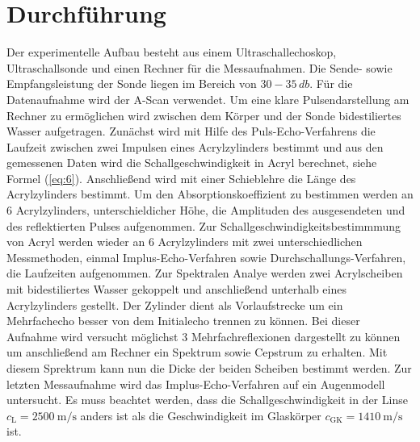\section{Durchführung}
Der experimentelle Aufbau besteht aus einem Ultraschallechoskop, Ultraschallsonde und einen Rechner für die Messaufnahmen.
Die Sende- sowie Empfangsleistung der Sonde liegen im Bereich von $30 - 35\, db$. Für die Datenaufnahme wird der A-Scan verwendet.
Um eine klare Pulsendarstellung am Rechner zu ermöglichen wird zwischen dem Körper und der Sonde bidestiliertes Wasser aufgetragen.
Zunächst wird mit Hilfe des Puls-Echo-Verfahrens die Laufzeit zwischen zwei Impulsen eines Acrylzylinders bestimmt und aus den gemessenen
Daten wird die Schallgeschwindigkeit in Acryl berechnet, siehe Formel (\ref{eq:6}).
Anschließend wird mit einer Schieblehre die Länge des Acrylzylinders bestimmt.
Um den Absorptionskoeffizient zu bestimmen werden an 6 Acrylzylinders, unterschieldicher Höhe, die Amplituden des ausgesendeten und des reflektierten Pulses aufgenommen.
Zur Schallgeschwindigkeitsbestimmmung von Acryl werden wieder an 6 Acrylzylinders mit zwei unterschiedlichen Messmethoden, einmal Implus-Echo-Verfahren sowie Durchschallungs-Verfahren,
die Laufzeiten aufgenommen.
\newline
Zur Spektralen Analye werden zwei Acrylscheiben mit bidestiliertes Wasser gekoppelt und anschließend unterhalb eines Acrylzylinders gestellt.
Der Zylinder dient als Vorlaufstrecke um ein Mehrfachecho besser von dem Initialecho trennen zu können. Bei dieser Aufnahme wird versucht möglichst 3
Mehrfachreflexionen dargestellt zu können um anschließend am Rechner ein Spektrum sowie Cepstrum zu erhalten. Mit diesem Sprektrum kann nun die Dicke
der beiden Scheiben bestimmt werden.
Zur letzten Messaufnahme wird das Implus-Echo-Verfahren auf ein Augenmodell untersucht. Es muss beachtet werden, dass die Schallgeschwindigkeit in der Linse
$c_\text{L} = \SI{2500}{\metre\per\second}$ anders ist als die Geschwindigkeit im Glaskörper $c_\text{GK} = \SI{1410}{\metre\per\second}$ ist.
